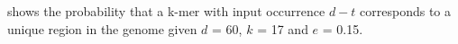 \documentclass[11pt]{article}
\begin{document}
 shows the probability that a k-mer with input occurrence $d-t$ corresponds to a unique region in the genome given $d$ = 60, $k$ = 17 and $e$ = 0.15.
%
%
\end{document}
